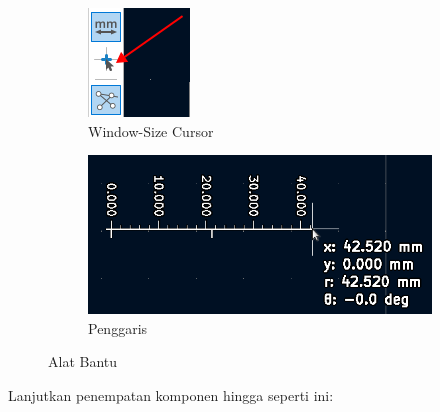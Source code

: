 \documentclass[12pt]{book}
\begin{document}
	\begin{figure}[!ht]
		\centering
		\begin{subfigure}[t]{0.2\textwidth}
			\includegraphics[width=\textwidth]{images/pcb/pcb_cursor}
			\caption{Window-Size Cursor}
		\end{subfigure}
		\begin{subfigure}[t]{0.45\textwidth}
			\includegraphics[width=\textwidth]{images/pcb/pcb_ruler}
			\caption{Penggaris}
		\end{subfigure}
		\caption{Alat Bantu}
	\end{figure}

	\newpage
	Lanjutkan penempatan komponen hingga seperti ini:
\end{document}
